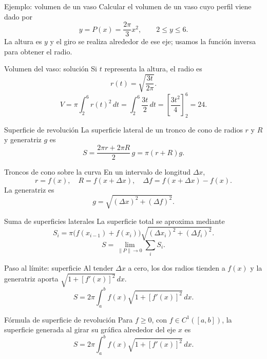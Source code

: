 \documentclass[original_version/main.tex]{subfiles}
\begin{document}
\begin{frame}{Ejemplo: volumen de un vaso}
Calcular el volumen de un vaso cuyo perfil viene dado por\[y=P(x)=\frac{2\pi}{3}x^2,\qquad 2\le y\le6.\]La altura es $y$ y el giro se realiza alrededor de ese eje; usamos la función inversa para obtener el radio.
\end{frame}

\begin{frame}{Volumen del vaso: solución}
\small Si $t$ representa la altura, el radio es\[r(t)=\sqrt{\frac{3t}{2\pi}}.\]\[V=\pi\int_2^6r(t)^2\,dt=\int_2^6\frac{3t}{2}\,dt=\left[\frac{3t^2}{4}\right]_2^6=\boxed{24}.\]
\end{frame}

\begin{frame}{Superficie de revolución}
La superficie lateral de un tronco de cono de radios $r$ y $R$ y generatriz $g$ es\[S=\frac{2\pi r+2\pi R}{2}\,g=\boxed{\pi(r+R)g}.\]
\end{frame}

\begin{frame}{Troncos de cono sobre la curva}
\small En un intervalo de longitud $\Delta x$,\[r=f(x),\quad R=f(x+\Delta x),\quad\Delta f=f(x+\Delta x)-f(x).\]La generatriz es\[g=\sqrt{(\Delta x)^2+(\Delta f)^2}.\]
\end{frame}

\begin{frame}{Suma de superficies laterales}
\small La superficie total se aproxima mediante\[S_i=\pi\bigl(f(x_{i-1})+f(x_i)\bigr)\sqrt{(\Delta x_i)^2+(\Delta f_i)^2}.\]\[S=\lim_{\|P\|\to0}\sum_i S_i.\]
\end{frame}

\begin{frame}{Paso al límite: superficie}
\small Al tender $\Delta x$ a cero, los dos radios tienden a $f(x)$ y la generatriz aporta $\sqrt{1+[f\prime(x)]^2}\,dx$.\[S=2\pi\int_a^b f(x)\sqrt{1+[f\prime(x)]^2}\,dx.\]
\end{frame}

\begin{frame}{Fórmula de superficie de revolución}
Para $f\ge0$, con $f\in C^1([a,b])$, la superficie generada al girar su gráfica alrededor del eje $x$ es\[\boxed{S=2\pi\int_a^b f(x)\sqrt{1+[f\prime(x)]^2}\,dx.}\]
\end{frame}
\end{document}
